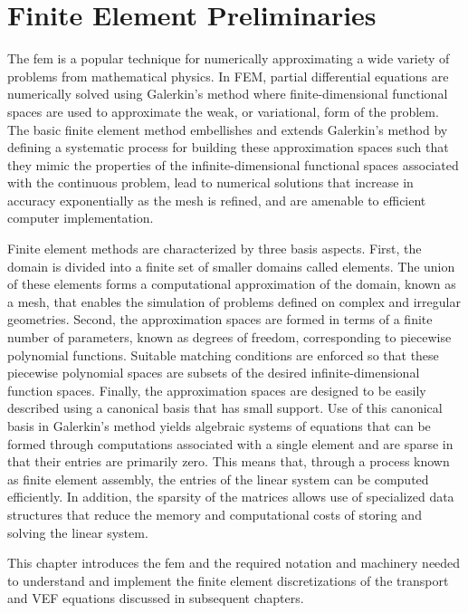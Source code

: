 \documentclass[../doc.tex]{subfiles}
\begin{document}
\chapter{Finite Element Preliminaries}
The \gls{fem} is a popular technique for numerically approximating a wide variety of problems from mathematical physics. In FEM, partial differential equations are numerically solved using Galerkin's method where finite-dimensional functional spaces are used to approximate the weak, or variational, form of the problem.
The basic finite element method embellishes and extends Galerkin's method by defining a systematic process for building these approximation spaces such that they mimic the properties of the infinite-dimensional functional spaces associated with the continuous problem, lead to numerical solutions that increase in accuracy exponentially as the mesh is refined, and are amenable to efficient computer implementation. 

Finite element methods are characterized by three basis aspects. First, the domain is divided into a finite set of smaller domains called elements. The union of these elements forms a computational approximation of the domain, known as a mesh, that enables the simulation of problems defined on complex and irregular geometries. Second, the approximation spaces are formed in terms of a finite number of parameters, known as degrees of freedom, corresponding to piecewise polynomial functions. 
Suitable matching conditions are enforced so that these piecewise polynomial spaces are subsets of the desired infinite-dimensional function spaces. 
Finally, the approximation spaces are designed to be easily described using a canonical basis that has small support. Use of this canonical basis in Galerkin's method yields algebraic systems of equations that can be formed through computations associated with a single element and are sparse in that their entries are primarily zero. This means that, through a process known as finite element assembly, the entries of the linear system can be computed efficiently. In addition, the sparsity of the matrices allows use of specialized data structures that reduce the memory and computational costs of storing and solving the linear system.

This chapter introduces the \gls{fem} and the required notation and machinery needed to understand and implement the finite element discretizations of the transport and VEF equations discussed in subsequent chapters. 
\end{document}
